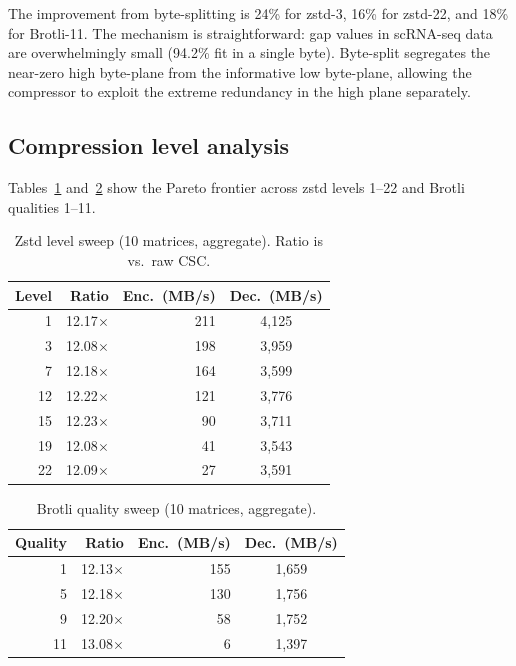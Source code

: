 \documentclass[10pt,twocolumn,letterpaper]{article}
\begin{document}
The improvement from byte-splitting is 24\% for zstd-3, 16\% for zstd-22, and 18\% for Brotli-11.
The mechanism is straightforward: gap values in scRNA-seq data are overwhelmingly small (94.2\% fit in a single byte).
Byte-split segregates the near-zero high byte-plane from the informative low byte-plane, allowing the compressor to exploit the extreme redundancy in the high plane separately.

\subsection{Compression level analysis}

Tables~\ref{tab:level} and~\ref{tab:brotli} show the Pareto frontier across zstd levels 1--22 and Brotli qualities 1--11.

\begin{table}[t]
\centering
\caption{Zstd level sweep (10 matrices, aggregate). Ratio is vs.\ raw CSC.}
\label{tab:level}
\footnotesize
\begin{tabular}{rrrc}
\toprule
Level & Ratio & Enc.\ (MB/s) & Dec.\ (MB/s) \\
\midrule
 1 & 12.17$\times$ & 211 & 4,125 \\
 3 & 12.08$\times$ & 198 & 3,959 \\
 7 & 12.18$\times$ & 164 & 3,599 \\
12 & 12.22$\times$ & 121 & 3,776 \\
15 & 12.23$\times$ & 90 & 3,711 \\
19 & 12.08$\times$ & 41 & 3,543 \\
22 & 12.09$\times$ & 27 & 3,591 \\
\bottomrule
\end{tabular}
\end{table}

\begin{table}[t]
\centering
\caption{Brotli quality sweep (10 matrices, aggregate).}
\label{tab:brotli}
\footnotesize
\begin{tabular}{rrrc}
\toprule
Quality & Ratio & Enc.\ (MB/s) & Dec.\ (MB/s) \\
\midrule
 1 & 12.13$\times$ &  155 & 1,659 \\
 5 & 12.18$\times$ &  130 & 1,756 \\
 9 & 12.20$\times$ &   58 & 1,752 \\
11 & 13.08$\times$ &    6 & 1,397 \\
\bottomrule
\end{tabular}
\end{table}
\end{document}
